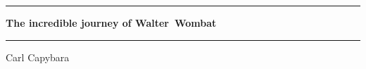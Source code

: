 \documentclass{article}
\begin{document}
\thispagestyle{empty}
\begin{center}
	\setlength{\parskip}{2ex}
\rule{\textwidth}{.4pt}\par
{\huge\bfseries The incredible journey of Walter~Wombat \par}
\rule{\textwidth}{.4pt}\par
\bigbreak
{\Large Carl Capybara\par}
\end{center}
\end{document}
